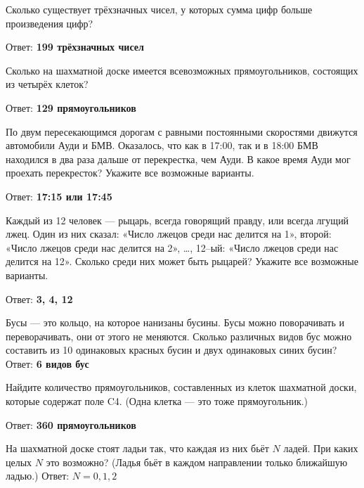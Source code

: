  Сколько существует трёхзначных чисел, у которых сумма цифр больше произведения цифр?

Ответ: \textbf{199 трёхзначных чисел}

 Сколько на шахматной доске имеется всевозможных прямоугольников, состоящих из четырёх клеток?

Ответ: \textbf{129 прямоугольников}

 По двум пересекающимся дорогам с равными постоянными скоростями движутся автомобили Ауди и БМВ. Оказалось, что как в 17:00, так и в 18:00 БМВ находился в два раза дальше от перекрестка, чем Ауди. В какое время Ауди мог проехать перекресток? Укажите все возможные варианты.

Ответ: \textbf{17:15 или 17:45}

Каждый из 12 человек — рыцарь, всегда говорящий правду, или всегда лгущий лжец. Один из них сказал: «Число лжецов среди нас делится на 1», второй: «Число лжецов среди нас делится на 2», …, 12–ый: «Число лжецов среди нас делится на 12». Сколько среди них может быть рыцарей? Укажите все возможные варианты.

Ответ: \textbf{3, 4, 12}

Бусы — это кольцо, на которое нанизаны бусины. Бусы можно поворачивать и переворачивать, они от этого не меняются. Сколько различных видов бус можно составить из 10 одинаковых красных бусин и двух одинаковых синих бусин?
Ответ: \textbf{6 видов бус}

Найдите количество прямоугольников, составленных из клеток шахматной доски, которые содержат поле C4. (Одна клетка — это тоже прямоугольник.)

Ответ: \textbf{360 прямоугольников}

На шахматной доске стоят ладьи так, что каждая из них бьёт $N$ ладей. При каких целых $N$ это возможно? (Ладья бьёт в каждом направлении только ближайшую ладью.) Ответ: \textbf{$N = 0, 1, 2$}


